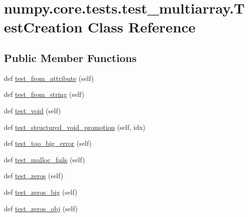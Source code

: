 \hypertarget{classnumpy_1_1core_1_1tests_1_1test__multiarray_1_1TestCreation}{}\section{numpy.\+core.\+tests.\+test\+\_\+multiarray.\+Test\+Creation Class Reference}
\label{classnumpy_1_1core_1_1tests_1_1test__multiarray_1_1TestCreation}
\subsection*{Public Member Functions}
\begin{DoxyCompactItemize}
\item 
def \hyperlink{classnumpy_1_1core_1_1tests_1_1test__multiarray_1_1TestCreation_a2387805fa3706274a5e53488d981bea4}{test\+\_\+from\+\_\+attribute} (self)
\item 
def \hyperlink{classnumpy_1_1core_1_1tests_1_1test__multiarray_1_1TestCreation_a49edd15e80d355f992c034e44b332b98}{test\+\_\+from\+\_\+string} (self)
\item 
def \hyperlink{classnumpy_1_1core_1_1tests_1_1test__multiarray_1_1TestCreation_a835c0a13cf37eb25b3bb7f699a68ccc7}{test\+\_\+void} (self)
\item 
def \hyperlink{classnumpy_1_1core_1_1tests_1_1test__multiarray_1_1TestCreation_a453b304c0c4561b743a93d4dc43951bf}{test\+\_\+structured\+\_\+void\+\_\+promotion} (self, idx)
\item 
def \hyperlink{classnumpy_1_1core_1_1tests_1_1test__multiarray_1_1TestCreation_ab351c0f2c457f8465ba644de8efa85a1}{test\+\_\+too\+\_\+big\+\_\+error} (self)
\item 
def \hyperlink{classnumpy_1_1core_1_1tests_1_1test__multiarray_1_1TestCreation_ae9e36fd43ce497622837430e60352880}{test\+\_\+malloc\+\_\+fails} (self)
\item 
def \hyperlink{classnumpy_1_1core_1_1tests_1_1test__multiarray_1_1TestCreation_a67d228b7b823524f4ebf98b43eb313df}{test\+\_\+zeros} (self)
\item 
def \hyperlink{classnumpy_1_1core_1_1tests_1_1test__multiarray_1_1TestCreation_aa26d0f3baef78169d0070cb176a791e3}{test\+\_\+zeros\+\_\+big} (self)
\item 
def \hyperlink{classnumpy_1_1core_1_1tests_1_1test__multiarray_1_1TestCreation_ae07a917effb1f35064751ffe3c09d088}{test\+\_\+zeros\+\_\+obj} (self)
\item 

\end{DoxyCompactItemize}
